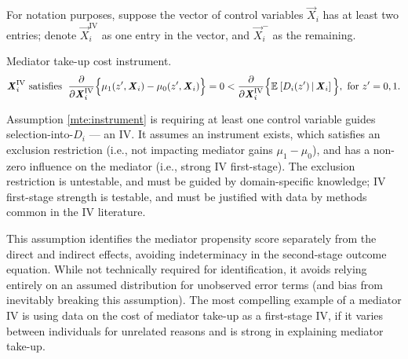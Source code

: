 For notation purposes, suppose the vector of control variables $\vec X_i$ has at least two entries;
denote $\vec X_i^{\text{IV}}$ as one entry in the vector, and $\vec X_i^-$ as the remaining.
\begin{assumptionMTE}
    \label{mte:instrument}
    Mediator take-up cost instrument.
    \[ \boldsymbol{\mathit{X}}_i^{\text{IV}} \textnormal{ satisfies } \;
    \frac{\partial}{\partial\boldsymbol{\mathit{X}}_i^{\text{IV}}}\Big\{
        \mu_1(z', \boldsymbol{\mathit{X}}_i) - \mu_0(z', \boldsymbol{\mathit{X}}_i) \Big\} = 0
        < \frac{\partial}{\partial\boldsymbol{\mathit{X}}_i^{\text{IV}}}
        \Big\{
            \mathbb{E}_{} \left[ D_i(z') \, \middle\vert \, \boldsymbol{\mathit{X}}_i \right]\Big\},
        \textnormal{ for } z' = 0, 1. \]
\end{assumptionMTE}
\noindent
Assumption \ref{mte:instrument} is requiring at least one control variable guides selection-into-$D_i$ --- an IV.
It assumes an instrument exists, which satisfies an exclusion restriction (i.e., not impacting mediator gains $\mu_1-\mu_0$), and has a non-zero influence on the mediator (i.e., strong IV first-stage).
The exclusion restriction is untestable, and must be guided by domain-specific knowledge; IV first-stage strength is testable, and must be justified with data by methods common in the IV literature.

This assumption identifies the mediator propensity score separately from the direct and indirect effects, avoiding indeterminacy in the second-stage outcome equation.
While not technically required for identification, it avoids relying entirely on an assumed distribution for unobserved error terms (and bias from inevitably breaking this assumption).
The most compelling example of a mediator IV is using data on the cost of mediator take-up as a first-stage IV, if it varies between individuals for unrelated reasons and is strong in explaining mediator take-up.

